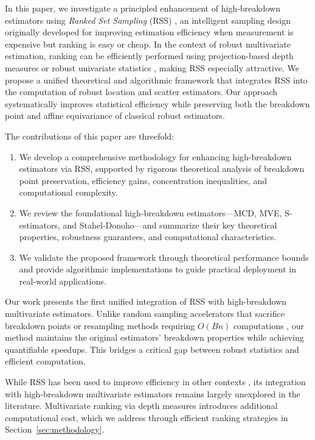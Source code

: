 \documentclass[12pt]{article}
\begin{document}
In this paper, we investigate a principled enhancement of high-breakdown estimators using \emph{Ranked Set Sampling} (RSS)
\cite{McIntyre1952,zhang2024birnbaum}, an intelligent sampling design originally developed for improving estimation efficiency when measurement is expensive but ranking is easy or cheap. In the context of robust multivariate estimation, ranking can be efficiently performed using projection-based depth measures or robust univariate statistics \cite{Hubert2012},
making RSS especially attractive. We propose a unified theoretical and algorithmic framework that integrates RSS into the computation of robust location and scatter estimators. Our approach systematically improves statistical efficiency while preserving both the breakdown point and affine equivariance of classical robust estimators.

The contributions of this paper are threefold:
\begin{enumerate}
    \item We develop a comprehensive methodology for enhancing high-breakdown estimators via RSS, supported by rigorous theoretical analysis of breakdown point preservation, efficiency gains, concentration inequalities, and computational complexity.
    \item We review the foundational high-breakdown estimators—MCD, MVE, S-estimators, and Stahel-Donoho—and summarize their key theoretical properties, robustness guarantees, and computational characteristics.
    \item We validate the proposed framework through theoretical performance bounds and provide algorithmic implementations to guide practical deployment in real-world applications.
\end{enumerate}

Our work presents the first unified integration of RSS with high-breakdown multivariate estimators. Unlike random sampling accelerators that sacrifice breakdown points \cite{maronna2019robust} or resampling methods requiring $O(Bn)$ computations \cite{rousseeuw1999fast}, our method maintains the original estimators' breakdown properties while achieving quantifiable speedups. This bridges a critical gap between robust statistics and efficient computation.

While RSS has been used to improve efficiency in other contexts \cite{yusuf2023novel}, its integration with high-breakdown multivariate estimators remains largely unexplored in the literature. Multivariate ranking via depth measures introduces additional computational cost, which we address through efficient ranking strategies in Section~\ref{sec:methodology}.
\end{document}
